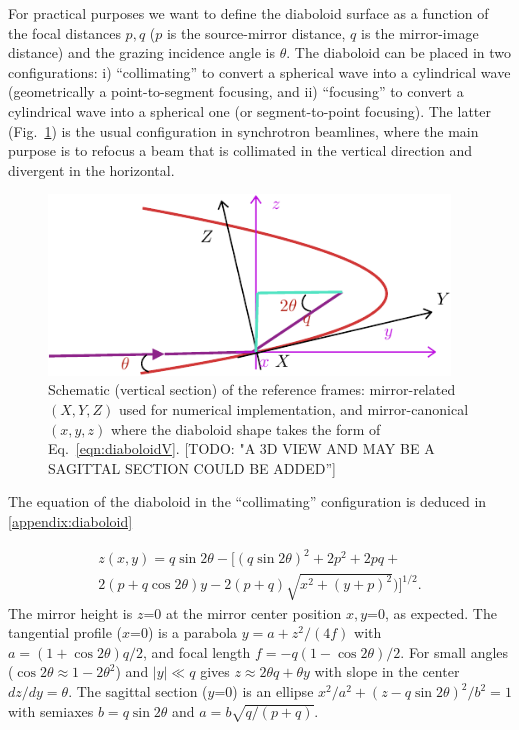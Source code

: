 \documentclass{iucr}              %
\newcommand{\todo}[1]{{\color{red}[TODO: "#1'']}}
\begin{document}
For practical purposes we want to define the diaboloid surface as a function of the focal distances $p,q$ ($p$ is the source-mirror distance, $q$ is the mirror-image distance) and the grazing incidence angle is $\theta$. The diaboloid can be placed in two configurations: i) ``collimating'' to convert a spherical wave into a cylindrical wave (geometrically a point-to-segment focusing, and ii) ``focusing'' to convert a cylindrical wave into a spherical one (or segment-to-point focusing). The latter (Fig.~\ref{fig:frame}) is the usual configuration in synchrotron beamlines, where the main purpose is to refocus a beam that is collimated in the vertical direction and divergent in the horizontal. 



\begin{figure}\label{fig:frame}
\includegraphics[width=0.95\textwidth]{figures/fig1.pdf}
%

\caption{Schematic (vertical section) of the reference frames: mirror-related $(X,Y,Z)$ used for numerical implementation, and mirror-canonical $(x,y,z)$ where the diaboloid shape takes the form of Eq.~\ref{eqn:diaboloidV}. \todo{A 3D VIEW AND MAY BE A SAGITTAL SECTION COULD BE ADDED}}
\end{figure}



The equation of the diaboloid in the ``collimating'' configuration is deduced in \ref{appendix:diaboloid}

\begin{multline}
\label{eqn:diaboloidV}
z(x,y) = q \sin2\theta - 
[ (q \sin{2\theta})^2 + 2p^2 + 2 p q + \\
2 (p + q \cos{2\theta}) y - 
2 (p+q)  \sqrt{x^2 + (y + p)^2}) 
]^{1/2}.
\end{multline}
The mirror height is $z$=0 at the mirror center position $x, y$=0, as expected. The tangential profile ($x$=0) is a parabola $y=a + z^2/(4f)$ with  $a=(1+\cos2\theta)q/2$, and focal length $ f = -q (1-\cos2\theta) /2$. For small angles ($\cos2\theta\approx 1 - 2\theta^2$) and $|y|\ll q$ gives $z\approx 2 \theta q + \theta y$ with slope in the center $dz/dy=\theta$. The sagittal section ($y$=0) is an ellipse $x^2/a^2 + (z - q \sin2\theta)^2/b^2=1$ with semiaxes $b=q \sin2\theta$ and $a=b \sqrt{q /(p+q)}$. 
\end{document}
